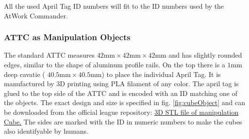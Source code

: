 {All the used April Tag ID numbers will fit to the ID numbers used by the AtWork Commander. 
%
%
%
%
%




\subsubsection{ATTC as Manipulation Objects}

The standard ATTC measures $42\si{\milli\meter} \times 42\si{\milli\meter} \times 42 \si{\milli\meter}$ and has slightly rounded edges, similar to the shape of aluminum profile rails. On the top there is a $1\si{\milli\meter}$ deep cavatie ( $40.5\si{\milli\meter} \times 40.5\si{\milli\meter}$) to place the individual April Tag. It is manufactured by 3D printing using PLA filament of any color. The april tag is glued to the top side of the ATTC and is encoded with an ID matching one of the objects.
The exact design and size is specified in fig. \ref{fig:cubeObject} and can be downloaded from the official league repository: \href{https://github.com/robocup-at-work/rulebook/tree/alpha_2023/images}{3D STL file of manipulation Cube.}
The sides are marked with the ID in numeric numbers to make the cubes also identifyable by humans.

}

